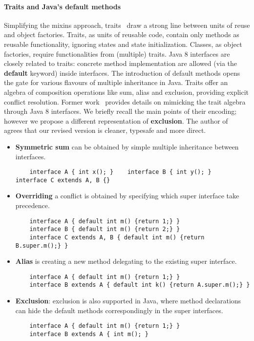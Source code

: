 \paragraph{Traits and Java's default methods}
Simplifying the mixins approach, traits~\cite{scharli03traits} draw a strong
line between units of reuse and object factories. Traits, as units of reusable
code, contain only methods as reusable functionality, ignoring states and state
initialization. Classes, as object factories, require functionalities from
(multiple) traits. Java 8 interfaces are closely related to
traits: concrete method implementation are allowed (via the \textbf{default}
keyword) inside interfaces. The introduction of default methods opens the gate
for various flavours of multiple inheritance in Java. Traits offer an algebra
of composition operations like sum, alias and exclusion, providing explicit conflict
resolution. Former work~\cite{bono14} provides details on mimicking the trait
algebra through Java 8 interfaces.  We briefly recall the main points of their
encoding; however we propose a different representation of \textbf{exclusion}.
The author of ~\cite{bono14} agrees that our revised version is cleaner,
typesafe and more direct.

\newcommand\shortItem{\vspace{-1ex}}
\begin{itemize}
\item \textbf{Symmetric sum} can be obtained by simple multiple inheritance between interfaces.
    \begin{lstlisting}
    interface A { int x(); }    interface B { int y(); }    interface C extends A, B {}
    \end{lstlisting}
\shortItem
\item \textbf{Overriding} a conflict is obtained by specifying which super interface take precedence.
    \begin{lstlisting}
    interface A { default int m() {return 1;} } 
    interface B { default int m() {return 2;} }
    interface C extends A, B { default int m() {return B.super.m();} }
    \end{lstlisting}
\shortItem
\item \textbf{Alias} is creating  a new method delegating to the existing super interface.
    \begin{lstlisting}
    interface A { default int m() {return 1;} }
    interface B extends A { default int k() {return A.super.m();} }
    \end{lstlisting}
\shortItem

\item \textbf{Exclusion}: exclusion is also supported in Java, where method declarations can hide the default methods correspondingly in the super interfaces.
    \begin{lstlisting}
    interface A { default int m() {return 1;} }
    interface B extends A { int m(); }
    \end{lstlisting}
\shortItem
\end{itemize}

